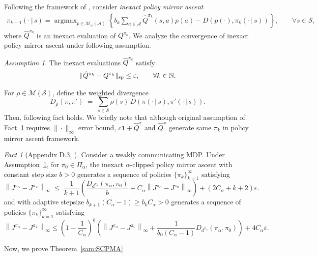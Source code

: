 \documentclass{article}
\theoremstyle{definition}
\theoremstyle{remark}
\newtheorem{fact}{Fact}
\newtheorem{assump}{Assumption}
\DeclareMathOperator*{\argmax}{argmax}
\newcommand{\cA}{\mathcal{A}}
\newcommand{\cS}{\mathcal{S}}
\newcommand{\cM}{\mathcal{M}}
\newcommand{\NN}{\mathbb{N}}
\newcommand*{\infn}[1]{\left\|{#1}\right\|_{\infty}}
\renewcommand{\sp}[1]{\|{#1}\|_\text{\rm sp}}
\begin{document}
Following the framework of \citep{lee2025multi}, consider \emph{inexact policy mirror ascent}
\begin{align*}
\pi_{k+1}(\cdot \,|\, s)
=
\argmax_{p \in \cM_\alpha(\mathcal{A})}
\left\{
b_k \sum_{a\in \cA} \hat{Q}^{\pi_k}(s,a) p(a) 
- D(p(\cdot),\pi_k(\cdot\,|\, s))
\right\},
\qquad \forall s \in \mathcal{S},
\end{align*}
where $\hat{Q}^{\pi_k}$ is an inexact evaluation of $Q^{\pi_k}$. We analyze the convergence of inexact policy mirror ascent under following assumption.
\begin{assump}\label{assum:inexact}
The inexact evaluations $\hat{Q}^{\pi_k}$ satisfy
\begin{align*}
\sp{\hat{Q}^{\pi_k} - Q^{\pi_k}}
\le \varepsilon,
\qquad \forall  k \in \NN.
\end{align*}
\end{assump}
For $\rho \in \cM(\cS)$, define the weighted divergence
\[
D_\rho(\pi,\pi') \;=\; \sum_{s\in\cS}\rho(s)\,D(\pi(\cdot\,|\,s),\pi'(\cdot\,|\,s)).
\] 
Then, following fact holds. We briefly note that although original assumption of Fact~\ref{fact:inexact} requires $\|\cdot\|_\infty$ error bound,  $c\mathbf{1}+\hat{Q}^\pi$ and  $\hat{Q}^\pi$ generate same $\pi_k$ in policy mirror ascent framework. 
\begin{fact}[Appendix D.3, \citep{lee2025multi}]\label{fact:inexact}
Consider a weakly communicating MDP. Under Assumption~\ref{assum:inexact}, for $\pi_0 \in \Pi_\alpha$, the inexact $\alpha$-clipped policy mirror ascent with constant step size $b>0$ generates a sequence of policies $\{\pi_{k}\}^\infty_{k=1}$ satisfying
\[\infn{J^{\pi_\alpha}-J^{\pi_k}} 
\;\le\; \frac{1}{k+1}\!\left( \frac{D_{d^{\pi_\alpha}}({\pi_\alpha}, \pi_0)}{b}
+ C_
\alpha \infn{J^{\pi_\alpha}-J^{\pi_0}} \right)+(2C_\alpha+k+2) \varepsilon.\]
and with  adaptive stepsize $b_{k+1}(C_\alpha - 1) \ge b_k C_\alpha>0$
generates a sequence of policies $\{\pi_{k}\}^\infty_{k=1}$ satisfying
\[\infn{J^{\pi_\alpha}-J^{\pi_k}}
\le
\left(1 - \frac{1}{C_\alpha}\right)^k
\left(
\infn{J^{\pi_\alpha}-J^{\pi_0}}
+
\frac{1}{b_0(C_\alpha - 1)} D_{d^{\pi_\alpha}}({\pi_\alpha}, \pi_0)
\right)
+
4C_\alpha \varepsilon.\]
\end{fact}

Now, we prove  Theorem~\ref{sam:SCPMA}
\end{document}
